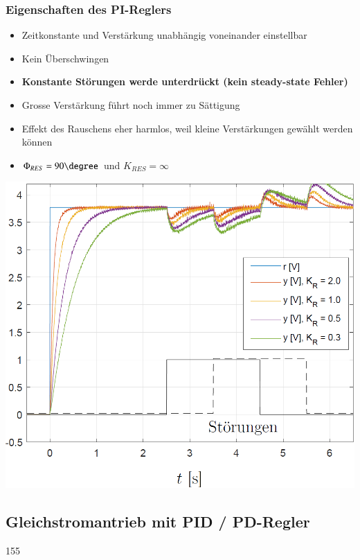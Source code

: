 \subsubsection{Eigenschaften des PI-Reglers}

\begin{minipage}[c]{0.48\columnwidth}
    \begin{itemize}
        \item Zeitkonstante und Verstärkung unabhängig voneinander einstellbar
        \item Kein Überschwingen
        \item \textbf{Konstante Störungen werde unterdrückt (kein steady-state Fehler)}
        \item Grosse Verstärkung führt noch immer zu Sättigung
        \item Effekt des Rauschens eher harmlos, weil kleine Verstärkungen gewählt werden können
        \item $\Phi_{RES} = 90 \degree$ und $K_{RES} = \infty$
    \end{itemize}
\end{minipage}
\hfill
\begin{minipage}[c]{0.45\columnwidth}
    \includegraphics[width=\columnwidth]{images/gleichstromantrieb_pi-regler_step_response.png}
\end{minipage}


\subsection{Gleichstromantrieb mit PID / PD-Regler}{155}


